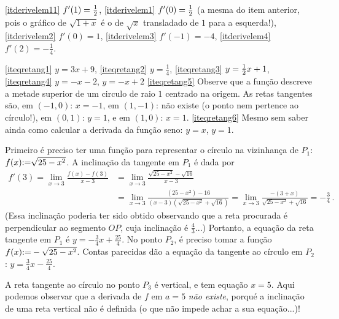 \begin{Solution}{6.3}
\eqref{itderivelem11} $f'(1)=\frac{1}{2}$,
\eqref{itderivelem1} $f'(0)=\frac{1}{2}$ (a mesma do item anterior, pois o
gráfico de $\sqrt{1+x}$ é o de $\sqrt{x}$ transladado de $1$ para a esquerda!),
\eqref{itderivelem2} $f'(0)=1$,
\eqref{itderivelem3} $f'(-1)=-4$,
\eqref{itderivelem4} $f'(2)=-\frac{1}{4}$.
\end{Solution}
\begin{Solution}{6.4}
\eqref{iteqretang1} $y=3x+9$,
\eqref{iteqretang2} $y=\frac{1}{4}$,
\eqref{iteqretang3} $y=\frac{1}{2} x+1$,
\eqref{iteqretang4} $y=-x-2$, $y=-x+2$
\eqref{iteqretang5} Observe que a função descreve a metade superior de um
circulo de raio $1$ centrado na origem. As retas tangentes são, em $(-1,0)$:
$x=-1$, em $(1,-1)$: não existe (o ponto nem pertence ao círculo!), em $(0,1)$:
$y=1$, e em $(1,0)$: $x=1$.
\eqref{iteqretang6} Mesmo sem saber ainda como calcular a derivada da
função seno: $y=x$, $y=1$.
\end{Solution}
\begin{Solution}{6.5}
Primeiro é preciso ter uma função para representar o círculo na vizinhança de
$P_1$: $f(x){:=} \sqrt{25-x^2}$. A inclinação da tangente em $P_1$ é dada por
\begin{align*}
f'(3)=\lim_{x\to 3}\frac{f(x)-f(3)}{x-3}&=
\lim_{x\to 3}\frac{\sqrt{25-x^2}-\sqrt{16}}{x-3}\\
&=\lim_{x\to 3}\frac{(25-x^2)-{16}}{(x-3)(\sqrt{25-x^2}+\sqrt{16})}
=\lim_{x\to 3}\frac{-(3+x)}{\sqrt{25-x^2}+\sqrt{16}}=-\tfrac34\,.
\end{align*}
(Essa inclinação poderia ter sido obtido observando que a reta
procurada é perpendicular ao segmento $OP$, cuja inclinação é
$\frac43$...)
Portanto, a equação da reta tangente em $P_1$ é $y=-\frac34
x+\frac{25}{4}$.  No ponto $P_2$, é preciso tomar a função
$f(x){:=} -\sqrt{25-x^2}$. Contas parecidas dão a equação
da tangente ao círculo em $P_2$: $y=\frac34 x-\frac{25}{4}$.
\begin{center}
\begin{bmlimage}\end{bmlimage}
\end{center}
A reta tangente ao círculo no ponto $P_3$ é vertical, e tem equação $x=5$.
Aqui podemos observar que a derivada de $f$ em $a=5$ \emph{não existe}, porqué
a inclinação de uma reta vertical não é definida (o que não impede achar a sua
equação...)!
\end{Solution}
